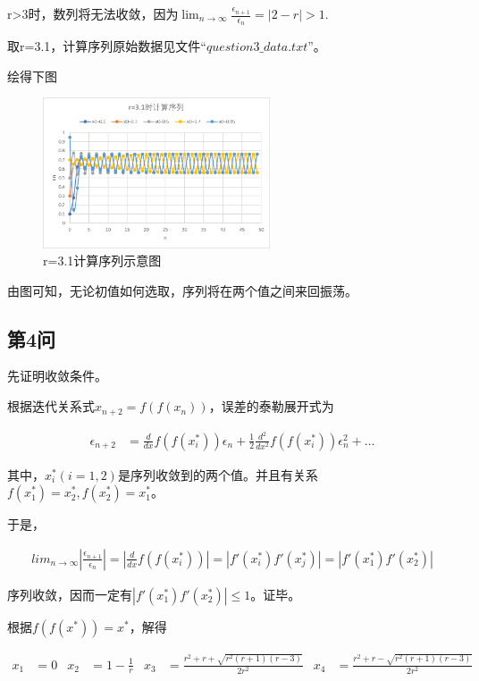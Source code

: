 \documentclass[10pt, a4paper]{article}
\begin{document}
    r>3时，数列将无法收敛，因为$\lim_{n \to \infty}\frac{\epsilon_{n+1}}{\epsilon_n}=|2-r|>1$.

    取r=3.1，计算序列原始数据见文件$“question3\_data.txt”$。

    绘得下图

    \begin{figure}[H]
        \centering
        \includegraphics[width=0.6\textwidth]{r=3.1时计算序列.png}
        \caption{r=3.1计算序列示意图}\label{r=3.1计算序列示意图}
    \end{figure}

    由图可知，无论初值如何选取，序列将在两个值之间来回振荡。

    
    \subsection{第4问}

    先证明收敛条件。

    根据迭代关系式$x_{n+2}=f(f(x_n))$，误差的泰勒展开式为

    \begin{align}
        \epsilon_{n+2}&=\frac{d}{dx}f(f(x_i^*))\epsilon_n+\frac{1}{2}\frac{d^2}{dx^2}f(f(x_i^*))\epsilon_n^2+\dots
    \end{align}
    
    其中，$x_i^*(i=1,2)$是序列收敛到的两个值。并且有关系$f(x_1^*)=x_2^*,f(x_2^*)=x_1^*$。

    于是，
    
    \begin{align}
        lim_{n\to\infty}|\frac{\epsilon_{n+1}}{\epsilon_n}|=|\frac{d}{dx}f(f(x_i^*))|=|f'(x_i^*)f'(x_j^*)|=|f'(x_1^*)f'(x_2^*)|
    \end{align}

    序列收敛，因而一定有$|f'(x_1^*)f'(x_2^*)|\le1$。证毕。

    根据$f(f(x^*))=x^*$，解得
    
    \begin{align}
        x_1&=0 & x_2&=1-\frac{1}{r} & x_3&=\frac{r^2+r+\sqrt{r^2(r+1)(r-3)}}{2r^2} & x_4&=\frac{r^2+r-\sqrt{r^2(r+1)(r-3)}}{2r^2}
    \end{align}
\end{document}
